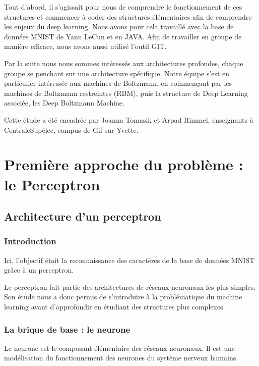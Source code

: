 \documentclass[a4paper,oneside]{report}
\begin{document}
            Tout d'abord, il s'agissait pour nous de comprendre le fonctionnement de ces structures et commencer à  coder des structures élémentaires afin de comprendre les enjeux du deep learning. Nous avons pour cela travaillé avec la base de données MNIST de Yann LeCun et en JAVA. Afin de travailler en groupe de manière efficace, nous avons aussi utilisé l'outil GIT.

            Par la suite nous nous sommes intéressés aux architectures profondes, chaque groupe se penchant sur une architecture spécifique. Notre équipe s'est en particulier intéressée aux machines de Boltzmann, en commençant par les machines de Boltzmann restreintes (RBM), puis la structure de Deep Learning associée, les Deep Boltzmann Machine.

            Cette étude a été encadrée par Joanna Tomasik et Arpad Rimmel, enseignants à  CentraleSupélec, campus de Gif-sur-Yvette.



    \part[Le Perceptron]{Première approche du problème : le Perceptron}


        \chapter{Architecture d'un perceptron}

            \section{Introduction}

                Ici, l'objectif était la reconnaissance des caractères de la base de données MNIST grâce à  un perceptron.

                Le perceptron fait partie des architectures de réseaux neuronaux les plus simples. Son étude nous a donc permis de s'introduire à  la problématique du machine learning avant d'approfondir en étudiant des structures plus complexes.


            \section{La brique de base : le neurone}

                Le neurone est le composant élémentaire des réseaux neuronaux. Il est une modélisation du fonctionnement des neurones du système nerveux humains.
\end{document}
